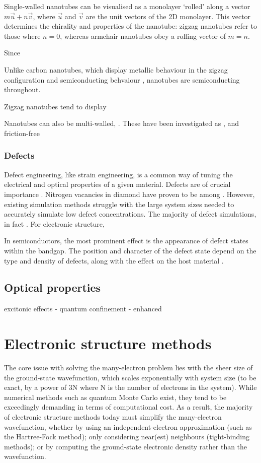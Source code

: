 \documentclass[11pt,a4paper,twoside]{report}  %
\numberwithin{equation}{section}					%
\numberwithin{figure}{section}						%
\begin{document}
Single-walled nanotubes can be visualised as a monolayer `rolled' along a vector $m\vec u+n\vec v$, where $\vec u$ and $\vec v$ are the unit vectors of the 2D monolayer. This vector determines the chirality and properties of the nanotube: zigzag nanotubes refer to those where $n=0$, whereas armchair nanotubes obey a rolling vector of $m=n$. 

Since 

Unlike carbon nanotubes, which display metallic behaviour in the zigzag configuration and semiconducting behvaiour ,  nanotubes are semiconducting throughout. 

Zigzag nanotubes tend to display 

Nanotubes can also be multi-walled, . These have been investigated as , and friction-free 

\subsubsection{Defects}

Defect engineering, like strain engineering, is a common way of tuning the electrical and optical properties of a given material. Defects are of crucial importance . Nitrogen vacancies in diamond have proven to be among . However, existing simulation methods struggle with the large system sizes needed to accurately simulate low defect concentrations. The majority of defect simulations, in fact . For electronic structure, 

In semiconductors, the most prominent effect is the appearance of defect states within the bandgap. The position and character of the defect state depend on the type and density of defects, along with the effect on the host material .


\subsection{Optical properties}


excitonic effects - quantum confinement - enhanced 


\section{Electronic structure methods}

The core issue with solving the many-electron problem lies with the sheer size of the ground-state wavefunction, which scales exponentially with system size (to be exact, by a power of 3N where N is the number of electrons in the system). While numerical methods such as quantum Monte Carlo exist, they tend to be exceedingly demanding in terms of computational cost\autocite{foulkesQuantumMonteCarlo2001}. As a result, the majority of electronic structure methods today must simplify the many-electron wavefunction, whether by using an independent-electron approximation (such as the Hartree-Fock method); only considering near(est) neighbours (tight-binding methods); or by computing the ground-state electronic density rather than the wavefunction.
\end{document}
